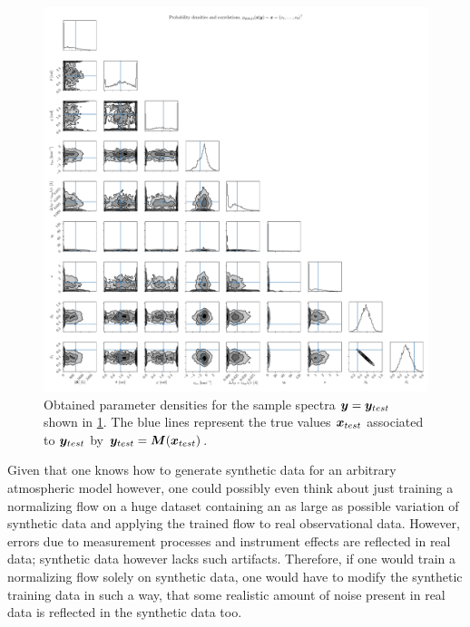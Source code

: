 \documentclass[a4paper,12pt]{report}
\begin{document}
\begin{figure}[h]
\centering
\includegraphics[width=\textwidth]{figures/nf-milne-eddington-example-3-corner-nflows-piecewisequadratic.pdf}
\caption{Obtained parameter densities for the sample spectra $\bm{y} = \bm{y}_{test}$ shown in \cref{fig:nf-milne-eddington-example-3-corner-nflows-piecewisequadratic}. The blue lines represent the true values $\bm{x}_{test}$ associated to $\bm{y}_{test}$ by $\bm{y}_{test} = \bm{M}(\bm{x}_{test})$.}
\label{fig:nf-milne-eddington-example-3-corner-nflows-piecewisequadratic}
\end{figure}

Given that one knows how to generate synthetic data for an arbitrary atmospheric model however, one could possibly even think about just training a normalizing flow on a huge dataset containing an as large as possible variation of synthetic data and applying the trained flow to real observational data. However, errors due to measurement processes and instrument effects are reflected in real data; synthetic data however lacks such artifacts. Therefore, if one would train a normalizing flow solely on synthetic data, one would have to modify the synthetic training data in such a way, that some realistic amount of noise present in real data is reflected in the synthetic data too.
\end{document}
